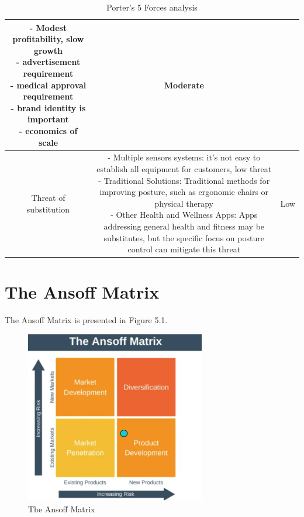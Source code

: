 \begin{table}[h]
\begin{tabular}{|c|c|c|}
{            -	Modest profitability, slow growth\\
            -	advertisement requirement\\
            -	medical approval requirement\\
            -	brand identity is important\\
            -	economics of scale
            \vspace{5pt}
        } & Moderate \\
    \hline
        Threat of substitution &  \parbox{10cm}{\vspace{5pt}
            -	Multiple sensors systems: it's not easy to establish all equipment for customers, low threat\\
            -	Traditional Solutions: Traditional methods for improving posture, such as ergonomic chairs or physical therapy\\
            -	Other Health and Wellness Apps: Apps addressing general health and fitness may be substitutes, but the specific focus on posture control can mitigate this threat\vspace{5pt}
            \vspace{5pt}} & Low \\
    \hline
    \end{tabular}
    \caption{Porter's 5 Forces analysis}
\end{table}

\section{The Ansoff Matrix}

The Ansoff Matrix is presented in Figure 5.1.

\begin{figure}[H]
	\centering
	\includegraphics[width=0.7\textwidth]{figures/ansoff_matrix.png}
	\caption{The Ansoff Matrix}
	\label{fig:performance_tree_fs}
\end{figure}


